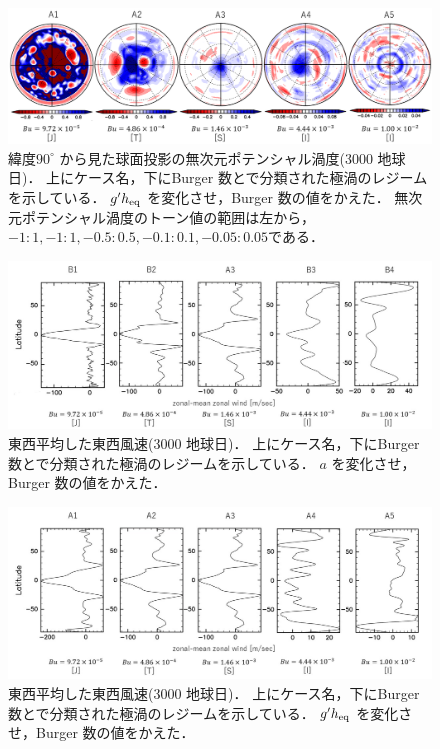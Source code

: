 \documentclass[a4j,12pt,openbib,oneside]{jreport}
\begin{document}
\begin{figure}[ht]
  \begin{center}
    \includegraphics[clip,width=14cm]{./fig/result/case1/case1_nonqv_gh.png}
    \caption{
      \footnotesize{緯度$90^\circ$ から見た球面投影の無次元ポテンシャル渦度(3000 地球日)．
上にケース名，下にBurger 数と\cite{Brueshaber2019}で分類された極渦のレジームを示している．
$g'h_{\rm{eq}}$ を変化させ，Burger 数の値をかえた．
無次元ポテンシャル渦度のトーン値の範囲は左から，$-1:1, -1:1, -0.5:0.5, -0.1:0.1, -0.05:0.05$である．
      }
    }
    \label{fig:case1_nonqv_gh}
  \end{center}
\end{figure}
%
\clearpage
\newpage
%
\begin{figure}[ht]
  \begin{center}
    \includegraphics[clip,width=14cm]{./fig/result/case1/case1_vellon_a.jpg}
    \caption{
      \footnotesize{東西平均した東西風速(3000 地球日)．
上にケース名，下にBurger 数と\cite{Brueshaber2019}で分類された極渦のレジームを示している．
$a$ を変化させ，Burger 数の値をかえた．
      }
    }
    \label{fig:case1_vellon_a}
  \end{center}
\end{figure}
%
%
\begin{figure}[ht]
  \begin{center}
    \includegraphics[clip,width=14cm]{./fig/result/case1/case1_vellon_gh.jpg}
    \caption{
      \footnotesize{東西平均した東西風速(3000 地球日)．
上にケース名，下にBurger 数と\cite{Brueshaber2019}で分類された極渦のレジームを示している．
$g'h_{\rm{eq}}$ を変化させ，Burger 数の値をかえた．
      }
    }
    \label{fig:case1_vellon_gh}
  \end{center}
\end{figure}
\end{document}
